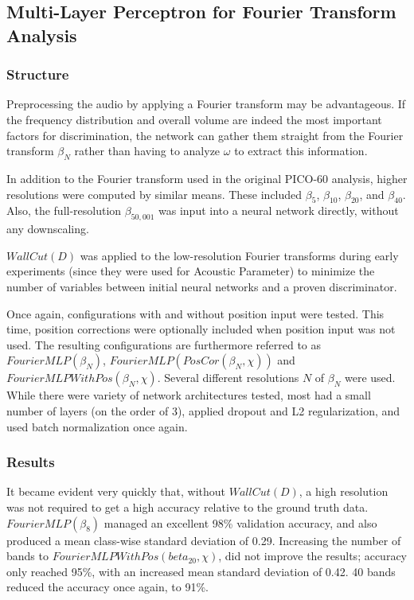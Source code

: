 \documentclass[10pt]{article}
\begin{document}
\subsection{Multi-Layer Perceptron for Fourier Transform Analysis}

\subsubsection{Structure}

Preprocessing the audio by applying a Fourier transform may be advantageous. If the frequency distribution and overall volume are indeed the most important factors for discrimination, the network can gather them straight from the Fourier transform $\beta_{N}$ rather than having to analyze $\omega$ to extract this information.

In addition to the Fourier transform used in the original PICO-60 analysis, higher resolutions were computed by similar means. These included $\beta _{5}$, $\beta _{10}$, $\beta _{20}$, and $\beta _{40}$. Also, the full-resolution $\beta _{50,001}$ was input into a neural network directly, without any downscaling.

$WallCut(D)$ was applied to the low-resolution Fourier transforms during early experiments (since they were used for Acoustic Parameter) to minimize the number of variables between initial neural networks and a proven discriminator.

Once again, configurations with and without position input were tested. This time, position corrections were optionally included when position input was not used. The resulting configurations are furthermore referred to as $FourierMLP(\beta_{N})$, $FourierMLP(PosCor(\beta_{N}, \chi))$ and $FourierMLPWithPos(\beta_{N}, \chi)$. Several different resolutions $N$ of $\beta_{N}$ were used. While there were variety of network architectures tested, most had a small number of layers (on the order of 3), applied dropout and L2 regularization, and used batch normalization once again.

\subsubsection{Results}

It became evident very quickly that, without $WallCut(D)$, a high resolution was not required to get a high accuracy relative to the ground truth data. $FourierMLP(\beta_{8})$ managed an excellent 98\% validation accuracy, and also produced a mean class-wise standard deviation of 0.29. Increasing the number of bands to $FourierMLPWithPos(beta_{20}, \chi)$, did not improve the results; accuracy only reached 95\%, with an increased mean standard deviation of 0.42. 40 bands reduced the accuracy once again, to 91\%.
\end{document}
